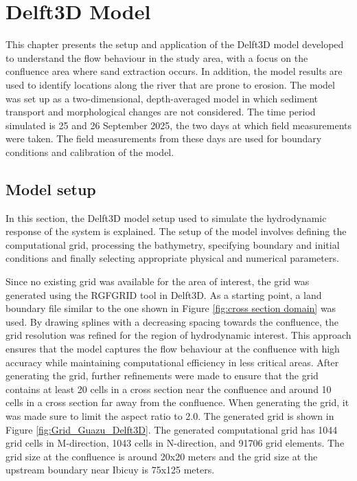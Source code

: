 \chapter{Delft3D Model}
\label{chap:Delft3DModel}
This chapter presents the setup and application of the Delft3D model developed to understand the flow behaviour in the study area, with a focus on the confluence area where sand extraction occurs. In addition, the model results are used to identify locations along the river that are prone to erosion. The model was set up as a two-dimensional, depth-averaged model in which sediment transport and morphological changes are not considered. The time period simulated is 25 and 26 September 2025, the two days at which field measurements were taken. The field measurements from these days are used for boundary conditions and calibration of the model.

\section{Model setup}
\label{sec:Delft3D setup}
In this section, the Delft3D model setup used to simulate the hydrodynamic response of the system is explained. The setup of the model involves defining the computational grid, processing the bathymetry, specifying boundary and initial conditions and finally selecting appropriate physical and numerical parameters.

Since no existing grid was available for the area of interest, the grid was generated using the RGFGRID tool in Delft3D. As a starting point, a land boundary file similar to the one shown in Figure \ref{fig:cross section domain} was used. By drawing splines with a decreasing spacing towards the confluence, the grid resolution was refined for the region of hydrodynamic interest. This approach ensures that the model captures the flow behaviour at the confluence with high accuracy while maintaining computational efficiency in less critical areas. After generating the grid, further refinements were made to ensure that the grid contains at least 20 cells in a cross section near the confluence and around 10 cells in a cross section far away from the confluence. When generating the grid, it was made sure to limit the aspect ratio to 2.0. The generated grid is shown in Figure \ref{fig:Grid_Guazu_Delft3D}. The generated computational grid has 1044 grid cells in M-direction, 1043 cells in N-direction, and 91706 grid elements. The grid size at the confluence is around 20x20 meters and the grid size at the upstream boundary near Ibicuy is 75x125 meters. 

